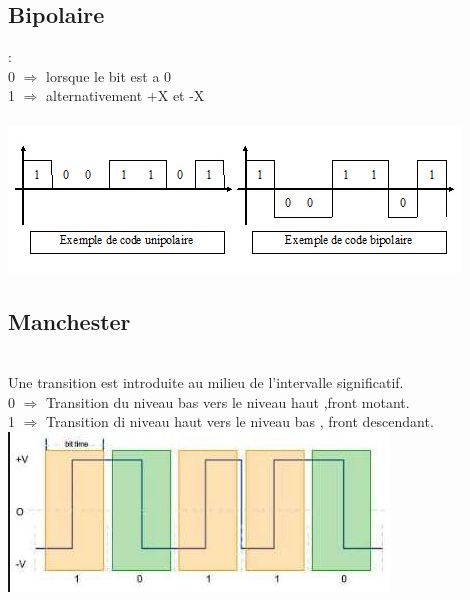 \documentclass[a4paper,8pt,openany]{book}
\begin{document}
\subsection{Bipolaire} : \\
0 $\Rightarrow$ lorsque le bit est a 0\\
1 $\Rightarrow$ alternativement +X et -X\\
\\
\includegraphics[width=1\linewidth]{img/code_uni_bipolaire.jpg}



\subsection{Manchester}\\
Une transition est introduite au milieu de l'intervalle significatif.\\
0 $\Rightarrow$ Transition du niveau bas vers le niveau haut ,front motant.\\
1 $\Rightarrow$ Transition di niveau haut vers le niveau bas , front descendant.\\
\includegraphics[width=1\linewidth]{img/code_manchester.png}
\\
\end{document}
